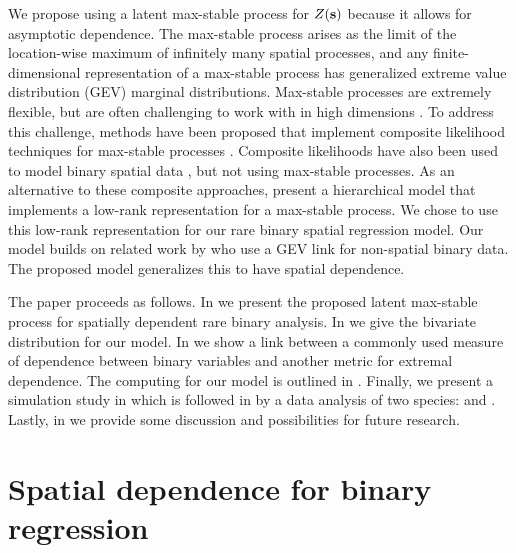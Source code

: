 \documentclass[12pt]{article}
\begin{document}
We propose using a latent max-stable process \citep{deHaan1984} for $Z(\mathbf{s})$ because it allows for asymptotic dependence.
The max-stable process arises as the limit of the location-wise maximum of infinitely many spatial processes, and any finite-dimensional representation of a max-stable process has generalized extreme value distribution (GEV) marginal distributions.
Max-stable processes are extremely flexible, but are often challenging to work with in high dimensions \citep{Wadsworth2014,Thibaud2013a}.
To address this challenge, methods have been proposed that implement composite likelihood techniques for max-stable processes \citep{Padoan2010,Genton2011,Huser2014}.
Composite likelihoods have also been used to model binary spatial data \citep{Heagerty1998}, but not using max-stable processes.
As an alternative to these composite approaches, \citet{Reich2012} present a hierarchical model that implements a low-rank representation for a max-stable process.
We chose to use this low-rank representation for our rare binary spatial regression model.
Our model builds on related work by \citet{Wang2010} who use a GEV link for non-spatial binary data.
The proposed model generalizes this to have spatial dependence.

The paper proceeds as follows.
In  we present the proposed latent max-stable process for spatially dependent rare binary analysis.
In  we give the bivariate distribution for our model.
In  we show a link between a commonly used measure of dependence between binary variables and another metric for extremal dependence.
The computing for our model is outlined in .
Finally, we present a simulation study in  which is followed in  by a data analysis of two species: \tamarix{} and \hedysarum{}.
Lastly, in  we provide some discussion and possibilities for future research.

\section{Spatial dependence for binary regression} \label{rbs:maxstab}
\end{document}
